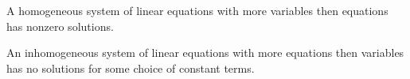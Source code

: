   \setcounter{thm}{25}
  \begin{thm} 
    A homogeneous system of linear equations with more variables then equations has nonzero solutions.
  \end{thm}

  \setcounter{thm}{27}
  \begin{thm} 
    An inhomogeneous system of linear equations with more equations then variables has no solutions for some choice of constant terms.
  \end{thm}
